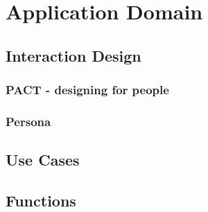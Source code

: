 \chapter{Application Domain}

\section{Interaction Design}
\subsection{PACT - designing for people}\label{pact}


\subsection{Persona}


\section{Use Cases}\label{usecase}


\section{Functions}

